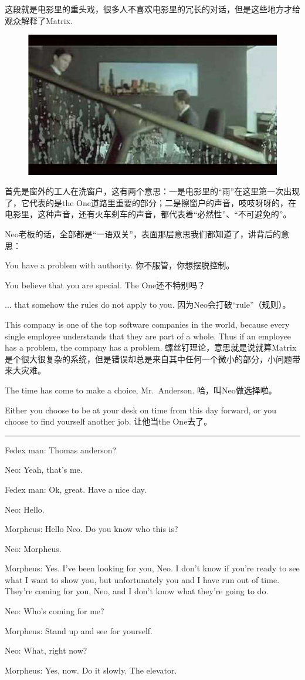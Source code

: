 \documentclass[UTF8]{ctexart}
\newcommand{\myparsep}{\noindent \rule[0.5ex]{\linewidth}{1pt}}
\newenvironment{myquote}{\color{green} \setlength{\leftskip}{6em} \setlength{\rightskip}{4em} \setlength{\parindent}{-2em}}{\par}
\begin{document}
这段就是电影里的重头戏，很多人不喜欢电影里的冗长的对话，但是这些地方才给观众解释了Matrix.

\begin{figure}[htb]
\centering
\includegraphics[width=0.5\linewidth]{fig/read_Matrix-7}
\end{figure}

首先是窗外的工人在洗窗户，这有两个意思：一是电影里的“雨”在这里第一次出现了，它代表的是the One道路里重要的部分；二是擦窗户的声音，吱吱呀呀的，在电影里，这种声音，还有火车刹车的声音，都代表着“必然性”、“不可避免的”。

Neo老板的话，全部都是“一语双关”，表面那层意思我们都知道了，讲背后的意思：

You have a problem with authority. 你不服管，你想摆脱控制。

You believe that you are special. The One还不特别吗？

... that somehow the rules do not apply to you. 因为Neo会打破“rule”（规则）。

This company is one of the top software companies in the world, because every single employee understands that they are part of a whole. Thus if an employee has a problem, the company has a problem. 螺丝钉理论，意思就是说就算Matrix是个很大很复杂的系统，但是错误却总是来自其中任何一个微小的部分，小问题带来大灾难。

The time has come to make a choice, Mr.~Anderson. 哈，叫Neo做选择啦。

Either you choose to be at your desk on time from this day forward, or you choose to find yourself another job. 让他当the One去了。

\myparsep

\begin{myquote}
Fedex man: Thomas anderson?

Neo: Yeah, that's me.

Fedex man: Ok, great. Have a nice day.

Neo: Hello.

Morpheus: Hello Neo. Do you know who this is?

Neo: Morpheus.

Morpheus: Yes. I've been looking for you, Neo. I don't know if you're ready to see what I want to show you, but unfortunately you and I have run out of time. They're coming for you, Neo, and I don't know what they're going to do.

Neo: Who's coming for me?

Morpheus: Stand up and see for yourself.

Neo: What, right now?

Morpheus: Yes, now. Do it slowly. The elevator.
\end{myquote}
\end{document}
